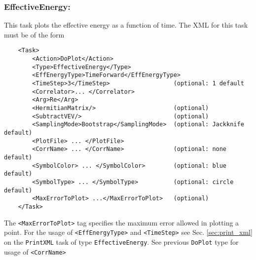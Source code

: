 \documentclass[12pt,notitlepage,letterpaper]{article}
\newcommand{\vb}{\texttt}
\begin{document}
\subsubsection{EffectiveEnergy:}
This task plots the effective energy as a function of time. The XML for this task must be of the form
\begin{verbatim}
    <Task>
        <Action>DoPlot</Action>
        <Type>EffectiveEnergy</Type>
        <EffEnergyType>TimeForward</EffEnergyType>
        <TimeStep>3</TimeStep>                  (optional: 1 default
        <Correlator>... </Correlator>
        <Arg>Re</Arg>
        <HermitianMatrix/>                      (optional)
        <SubtractVEV/>                          (optional)
        <SamplingMode>Bootstrap</SamplingMode>  (optional: Jackknife default)
        <PlotFile> ... </PlotFile>
        <CorrName> ... </CorrName>              (optional: none default)
        <SymbolColor> ... </SymbolColor>        (optional: blue default)
        <SymbolType> ... </SymbolType>          (optional: circle default)
        <MaxErrorToPlot> ...</MaxErrorToPlot>   (optional)
    </Task> 
\end{verbatim}
The \vb{<MaxErrorToPlot>} tag specifies the maximum error allowed in plotting a point.
For the usage of \vb{<EffEnergyType>} and \vb{<TimeStep>} see Sec. \ref{sec:print_xml}
on the \vb{PrintXML} task of type \vb{EffectiveEnergy}.
See previous \vb{DoPlot} type for usage of \vb{<CorrName>}
\end{document}
